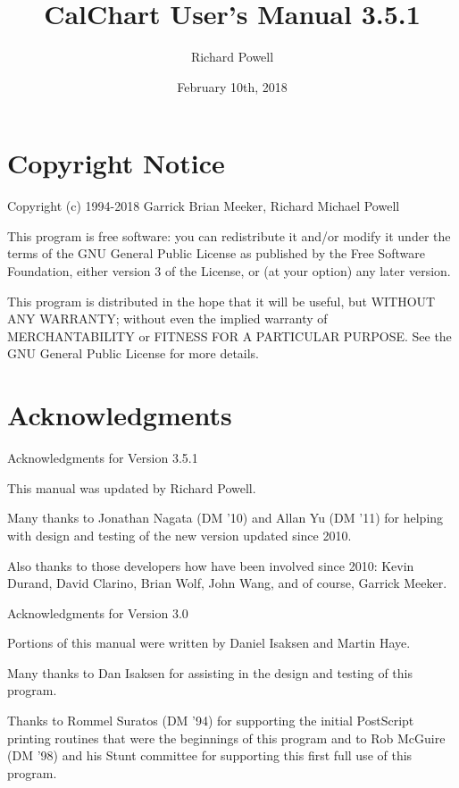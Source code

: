 \title{CalChart User's Manual 3.5.1}
\author{Richard Powell}
\date{February 10th, 2018}
\makeindex

\maketitle
\tableofcontents

\chapter*{Copyright Notice}\label{copyright}

Copyright (c) 1994-2018  Garrick Brian Meeker, Richard Michael Powell

This program is free software: you can redistribute it and/or modify
it under the terms of the GNU General Public License as published by
the Free Software Foundation, either version 3 of the License, or
(at your option) any later version.

This program is distributed in the hope that it will be useful,
but WITHOUT ANY WARRANTY; without even the implied warranty of
MERCHANTABILITY or FITNESS FOR A PARTICULAR PURPOSE.  See the
GNU General Public License for more details.



\chapter*{Acknowledgments}\label{acknowledge}

Acknowledgments for Version 3.5.1

This manual was updated by Richard Powell.

Many thanks to Jonathan Nagata (DM '10) and Allan Yu (DM '11) for helping
with design and testing of the new version updated since 2010.

Also thanks to those developers how have been involved since 2010:
Kevin Durand, David Clarino, Brian Wolf, John Wang, and of course, Garrick Meeker.

Acknowledgments for Version 3.0

Portions of this manual were written by Daniel Isaksen and Martin Haye.

Many thanks to Dan Isaksen for assisting in the design and testing of
this program.

Thanks to Rommel Suratos (DM '94) for supporting the initial PostScript
printing routines that were the beginnings of this program and to Rob
McGuire (DM '98) and his Stunt committee for supporting this first full
use of this program.

